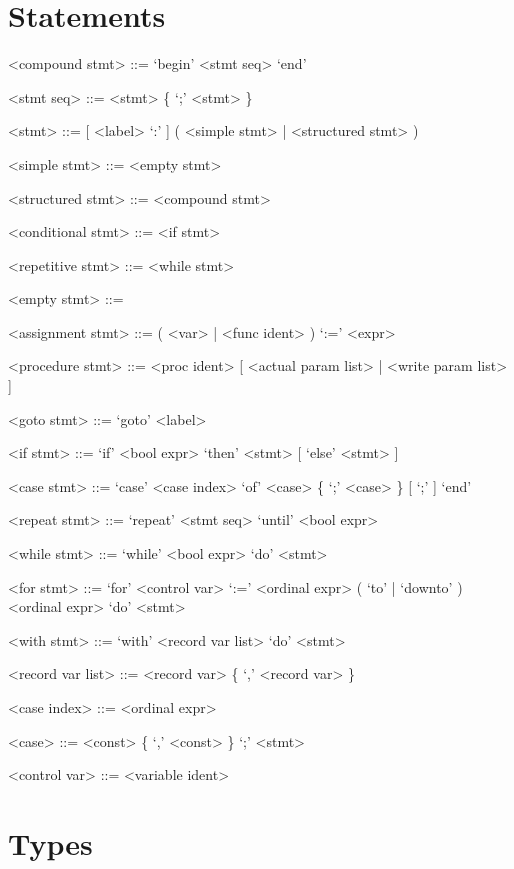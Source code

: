 \documentclass{article}
\begin{document}
\section{Statements}

{
  \begin{grammar}
    <compound stmt> ::= `begin' <stmt seq> `end'

    <stmt seq> ::= <stmt> \{ `;' <stmt> \}

    <stmt> ::= [ <label> `:' ] ( <simple stmt> | <structured stmt> )

    <simple stmt> ::= <empty stmt>   

    <structured stmt> ::= <compound stmt>   

    <conditional stmt> ::= <if stmt> 

    <repetitive stmt> ::= <while stmt>  

    <empty stmt> ::= \hphantom{}

    <assignment stmt> ::= ( <var> | <func ident> ) `:=' <expr>

    <procedure stmt> ::= <proc ident> [ <actual param list> | <write param list> ]

    <goto stmt> ::= `goto' <label>

    <if stmt> ::= `if' <bool expr> `then' <stmt> [ `else' <stmt> ]

    <case stmt> ::= `case' <case index> `of' <case> \{ `;' <case> \} [ `;' ] `end'

    <repeat stmt> ::= `repeat' <stmt seq> `until' <bool expr>

    <while stmt> ::= `while' <bool expr> `do' <stmt>

    <for stmt> ::= `for' <control var> `:=' <ordinal expr> ( `to' | `downto' ) \\
    <ordinal expr> `do' <stmt>

    <with stmt> ::= `with' <record var list> `do' <stmt>

    <record var list> ::= <record var> \{ `,' <record var> \}

    <case index> ::= <ordinal expr>

    <case> ::= <const> \{ `,' <const> \} `;' <stmt>

    <control var> ::= <variable ident>
  \end{grammar}
}

\section{Types}
\end{document}
